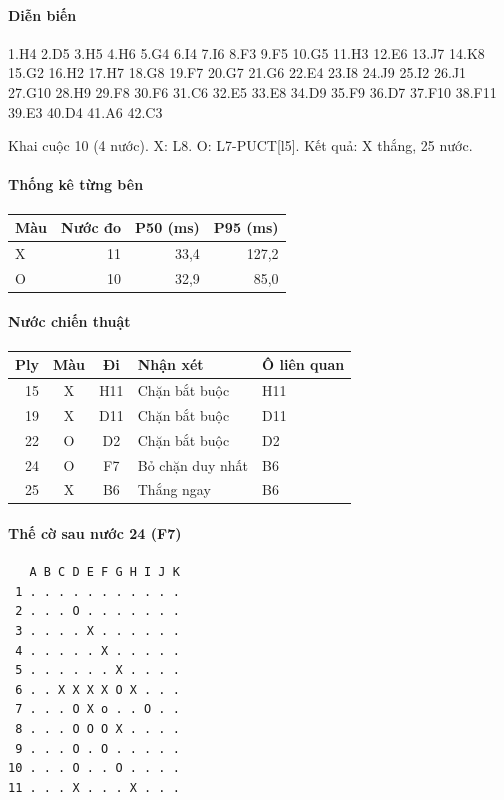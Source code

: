 \paragraph{Diễn biến}
{\footnotesize 1.H4 2.D5 3.H5 4.H6 5.G4 6.I4 7.I6 8.F3 9.F5 10.G5 11.H3 12.E6 13.J7 14.K8 15.G2 16.H2 17.H7 18.G8 19.F7 20.G7 21.G6 22.E4 23.I8 24.J9 25.I2 26.J1 27.G10 28.H9 29.F8 30.F6 31.C6 32.E5 33.E8 34.D9 35.F9 36.D7 37.F10 38.F11 39.E3 40.D4 41.A6 42.C3\par}
Khai cuộc 10 (4 nước). X: L8. O: L7-PUCT[l5]. Kết quả: X thắng, 25 nước.
\paragraph{Thống kê từng bên}
\begin{center}\small
\begin{tabular}{@{}lrrr@{}}
\toprule
Màu & Nước đo & P50 (ms) & P95 (ms) \\
\midrule
X & 11 & 33,4 & 127,2 \\
O & 10 & 32,9 & 85,0 \\
\bottomrule
\end{tabular}
\end{center}
\paragraph{Nước chiến thuật}
\begin{center}\small
\begin{tabular}{@{}rccll@{}}
\toprule
Ply & Màu & Đi & Nhận xét & Ô liên quan \\
\midrule
15 & X & H11 & Chặn bắt buộc & H11 \\
19 & X & D11 & Chặn bắt buộc & D11 \\
22 & O & D2 & Chặn bắt buộc & D2 \\
24 & O & F7 & Bỏ chặn duy nhất & B6 \\
25 & X & B6 & Thắng ngay & B6 \\
\bottomrule
\end{tabular}
\end{center}
\paragraph{Thế cờ sau nước 24 (F7)}
\begin{verbatim}
   A B C D E F G H I J K
 1 . . . . . . . . . . .
 2 . . . O . . . . . . .
 3 . . . . X . . . . . .
 4 . . . . . X . . . . .
 5 . . . . . . X . . . .
 6 . . X X X X O X . . .
 7 . . . O X o . . O . .
 8 . . . O O O X . . . .
 9 . . . O . O . . . . .
10 . . . O . . O . . . .
11 . . . X . . . X . . .
\end{verbatim}

